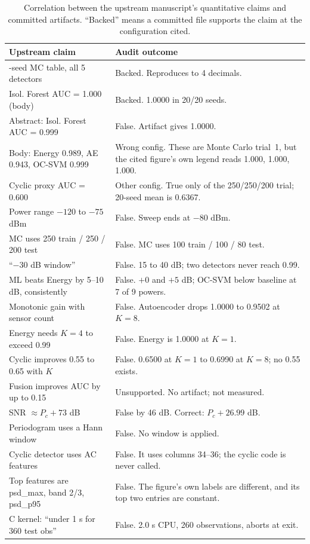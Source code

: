 \documentclass[conference]{IEEEtran}
\begin{document}
\begin{table}[t]
\centering
\caption{Correlation between the upstream manuscript's quantitative claims and committed artifacts. ``Backed'' means a committed file supports the claim at the configuration cited.}
\label{tab:claims}
\small
\footnotesize
\setlength{\tabcolsep}{3.4pt}
\begin{tabular}{>{\raggedright\arraybackslash}p{}>{\raggedright\arraybackslash}p{}}
\toprule
Upstream claim & Audit outcome \\
\midrule
20-seed MC table, all 5 detectors & Backed. Reproduces to 4 decimals. \\
Isol. Forest AUC = 1.000 (body) & Backed. 1.0000 in 20/20 seeds. \\
Abstract: Isol. Forest AUC = 0.999 & False. Artifact gives 1.0000. \\
Body: Energy 0.989, AE 0.943, OC-SVM 0.999 & Wrong config. These are Monte Carlo trial~1, but the cited figure's own legend reads 1.000, 1.000, 1.000. \\
Cyclic proxy AUC = 0.600 & Other config. True only of the 250/250/200 trial; 20-seed mean is 0.6367. \\
Power range $-120$ to $-75$ dBm & False. Sweep ends at $-80$ dBm. \\
MC uses 250 train / 250 / 200 test & False. MC uses 100 train / 100 / 80 test. \\
``$-30$ dB window'' & False. 15 to 40 dB; two detectors never reach 0.99. \\
ML beats Energy by 5--10 dB, consistently & False. $+0$ and $+5$ dB; OC-SVM below baseline at 7 of 9 powers. \\
Monotonic gain with sensor count & False. Autoencoder drops 1.0000 to 0.9502 at $K=8$. \\
Energy needs $K=4$ to exceed 0.99 & False. Energy is 1.0000 at $K=1$. \\
Cyclic improves 0.55 to 0.65 with $K$ & False. 0.6500 at $K=1$ to 0.6990 at $K=8$; no 0.55 exists. \\
Fusion improves AUC by up to 0.15 & Unsupported. No artifact; not measured. \\
SNR $\approx P_c + 73$ dB & False by 46 dB. Correct: $P_c + 26.99$ dB. \\
Periodogram uses a Hann window & False. No window is applied. \\
Cyclic detector uses AC features & False. It uses columns 34--36; the cyclic code is never called. \\
Top features are psd\_max, band 2/3, psd\_p95 & False. The figure's own labels are different, and its top two entries are constant. \\
C kernel: ``under 1 s for 360 test obs'' & False. 2.0 s CPU, 260 observations, aborts at exit. \\
\bottomrule
\end{tabular}
\end{table}
\end{document}
